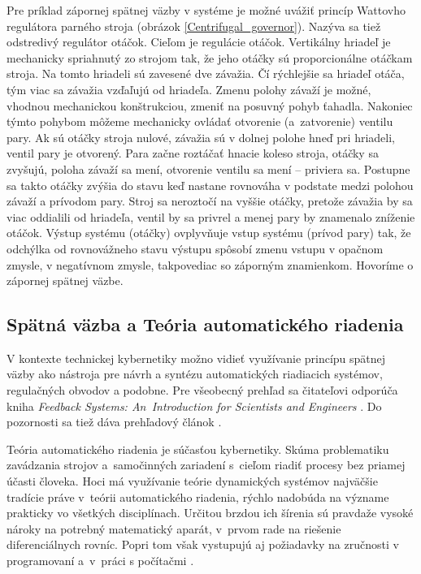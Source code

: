 \documentclass[a4paper, 10pt, ]{article}
\begin{document}
Pre príklad zápornej spätnej väzby v systéme je možné uvážiť princíp Wattovho regulátora parného stroja (obrázok \ref{Centrifugal_governor}). Nazýva sa tiež odstredivý regulátor otáčok. Cieľom je regulácie otáčok. Vertikálny hriadeľ je mechanicky spriahnutý zo strojom tak, že jeho otáčky sú proporcionálne otáčkam stroja. Na tomto hriadeli sú zavesené dve závažia. Čí rýchlejšie sa hriadeľ otáča, tým viac sa závažia vzďaľujú od hriadeľa. Zmenu polohy závaží je možné, vhodnou mechanickou konštrukciou, zmeniť na posuvný pohyb ťahadla. Nakoniec týmto pohybom môžeme mechanicky ovládať otvorenie (a~zatvorenie) ventilu pary. Ak sú otáčky stroja nulové, závažia sú v dolnej polohe hneď pri hriadeli, ventil pary je otvorený. Para začne roztáčať hnacie koleso stroja, otáčky sa zvyšujú, poloha závaží sa mení, otvorenie ventilu sa mení -- priviera sa. Postupne sa takto otáčky zvýšia do stavu keď nastane rovnováha v podstate medzi polohou závaží a prívodom pary. Stroj sa neroztočí na vyššie otáčky, pretože závažia by sa viac oddialili od hriadeľa, ventil by sa privrel a menej pary by znamenalo zníženie otáčok. Výstup systému (otáčky) ovplyvňuje vstup systému (prívod pary) tak, že odchýlka od rovnovážneho stavu výstupu spôsobí zmenu vstupu v opačnom zmysle, v negatívnom zmysle, takpovediac so záporným znamienkom. Hovoríme o zápornej spätnej väzbe. 




\subsection{Spätná väzba a Teória automatického riadenia}

V kontexte technickej kybernetiky možno vidieť využívanie princípu spätnej väzby ako nástroja pre návrh a syntézu automatických riadiacich systémov, regulačných obvodov a podobne. Pre všeobecný prehľad sa čitateľovi odporúča kniha \emph{Feedback Systems: An~Introduction for Scientists and Engineers} \cite{Aastroem2020}. Do pozornosti sa tiež dáva prehľadový článok \cite{Aastroem2014}.



Teória automatického riadenia je súčasťou kybernetiky. Skúma problematiku zavádzania strojov a~samočinných zariadení s~cieľom riadiť procesy bez priamej účasti človeka. Hoci má využívanie teórie dynamických systémov najväčšie tradície práve v~teórii automatického riadenia, rýchlo nadobúda na význame prakticky vo všetkých disciplínach. Určitou brzdou ich šírenia sú pravdaže vysoké nároky na potrebný matematický aparát, v~prvom rade na riešenie diferenciálnych rovníc. Popri tom však vystupujú aj požiadavky na zručnosti v programovaní a~v~práci s počítačmi \cite{Huba2002}.
\end{document}
